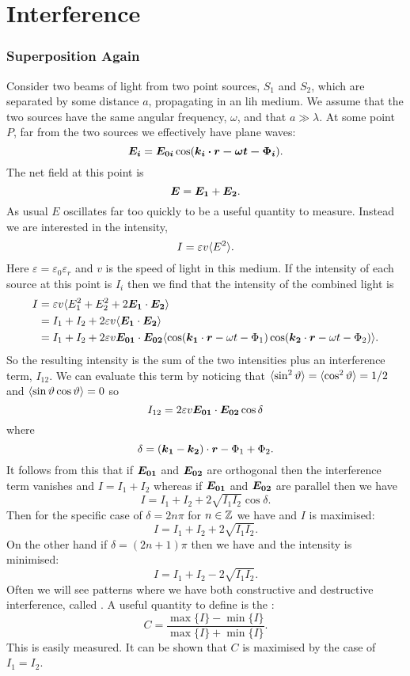\part{Interference}
    \section{Superposition Again}
    Consider two beams of light from two point sources, \(S_1\) and \(S_2\), which are separated by some distance \(a\), propagating in an \gls{lih} medium.
    We assume that the two sources have the same angular frequency, \(\omega\), and that \(a \gg \lambda\).
    At some point \(P\), far from the two sources we effectively have plane waves:
    \[\bm{E_i} = \bm{E_{0i}}\cos(\bm{k_i\cdot\bm{r} - \omega t - \Phi_i}).\]
    The net field at this point is
    \[\bm{E} = \bm{E_1} + \bm{E_2}.\]
    As usual \(E\) oscillates far too quickly to be a useful quantity to measure.
    Instead we are interested in the intensity,
    \[I = \varepsilon v\langle{E^2}\rangle.\]
    Here \(\varepsilon = \varepsilon_0\varepsilon_r\) and \(v\) is the speed of light in this medium.
    If the intensity of each source at this point is \(I_i\) then we find that the intensity of the combined light is
    \begin{align*}
        I &= \varepsilon v\langle{E_1^2 + E_2^2 + 2\bm{E_1}\cdot\bm{E_2}}\rangle\\
        &= I_1 + I_2 + 2\varepsilon v\langle{\bm{E_1}\cdot\bm{E_2}}\rangle\\
        &= I_1 + I_2 + 2\varepsilon v\bm{E_{01}}\cdot\bm{E_{02}}\langle{\cos(\bm{k_1}\cdot\bm{r} - \omega t - \Phi_1)\cos(\bm{k_2}\cdot\bm{r} - \omega t - \Phi_2)}\rangle.
    \end{align*}
    So the resulting intensity is the sum of the two intensities plus an interference term, \(I_{12}\).
    We can evaluate this term by noticing that \(\langle{\sin^2\vartheta}\rangle = \langle{\cos^2\vartheta}\rangle = 1/2\) and \(\langle{\sin\vartheta\cos\vartheta}\rangle = 0\) so
    \[I_{12} = 2\varepsilon v\bm{E_{01}}\cdot\bm{E_{02}}\cos \delta\]
    where
    \[\delta = (\bm{k_1} - \bm{k_2})\cdot\bm{r} - \Phi_1 + \Phi_2.\]
    It follows from this that if \(\bm{E_{01}}\) and \(\bm{E_{02}}\) are orthogonal then the interference term vanishes and \(I = I_1 + I_2\) whereas if \(\bm{E_{01}}\) and \(\bm{E_{02}}\) are parallel then we have
    \[I = I_1 + I_2 + 2\sqrt{I_1I_2}\cos\delta.\]
    Then for the specific case of \(\delta = 2n\pi\) for \(n\in\mathbb{Z}\) we have  and \(I\) is maximised:
    \[I = I_1 + I_2 + 2\sqrt{I_1I_2}.\]
    On the other hand if \(\delta = (2n + 1)\pi\) then we have  and the intensity is minimised:
    \[I = I_1 + I_2 - 2\sqrt{I_1I_2}.\]
    Often we will see patterns where we have both constructive and destructive interference, called .
    A useful quantity to define is the :
    \[C = \frac{\max\{I\} - \min\{I\}}{\max\{I\} + \min\{I\}}.\]
    This is easily measured.
    It can be shown that \(C\) is maximised by the case of \(I_1 = I_2\).
    

